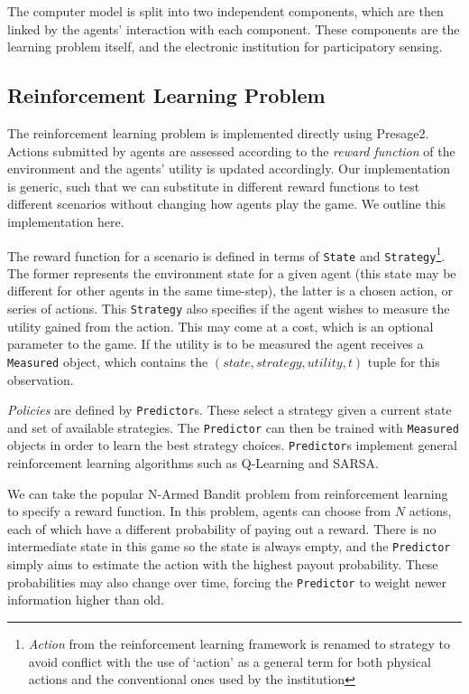 The computer model is split into two independent components, which are then
linked by the agents' interaction with each component. These components are
the learning problem itself, and the electronic institution for participatory
sensing.

\subsection{Reinforcement Learning Problem}

The reinforcement learning problem is implemented directly using Presage2.
Actions submitted by agents are assessed according to the \emph{reward
function} of the environment and the agents' utility is updated accordingly.
Our implementation is generic, such that we can substitute in different reward
functions to test different scenarios without changing how agents play the
game. We outline this implementation here.

The reward function for a scenario is defined in terms of \texttt{State} and
\texttt{Strategy}\footnote{\emph{Action} from the reinforcement learning
framework is renamed to strategy to avoid conflict with the use of `action' as
a general term for both physical actions and the conventional ones used by the
institution}. The former represents the environment state for a given agent
(this state may be different for other agents in the same time-step), the
latter is a chosen action, or series of actions. This \texttt{Strategy} also
specifies if the agent wishes to measure the utility gained from the action.
This may come at a cost, which is an optional parameter to the game. If the
utility is to be measured the agent receives a \texttt{Measured} object, which
contains the $(\mathit{state}, \mathit{strategy}, \mathit{utility}, t)$ tuple
for this observation.

\emph{Policies} are defined by \texttt{Predictor}s. These select a strategy
given a current state and set of available strategies. The \texttt{Predictor}
can then be trained with \texttt{Measured} objects in order to learn the best
strategy choices. \texttt{Predictor}s implement general reinforcement 
learning algorithms such as Q-Learning and SARSA.

We can take the popular N-Armed Bandit problem from reinforcement learning to
specify a reward function. In this problem, agents can choose from $N$
actions, each of which have a different probability of paying out a reward.
There is no intermediate state in this game so the state is always empty, and
the \texttt{Predictor} simply aims to estimate the action with the highest
payout probability. These probabilities may also change over time, forcing the
\texttt{Predictor} to weight newer information higher than old.

